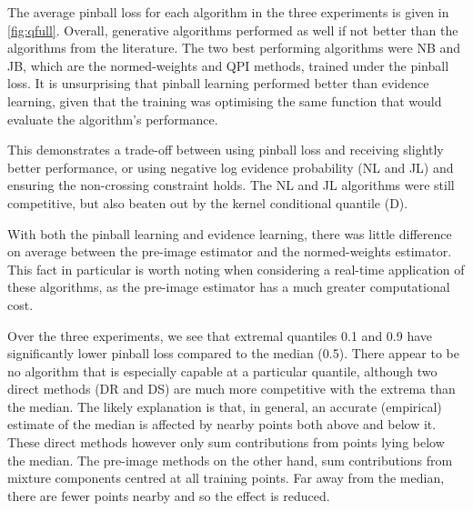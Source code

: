 \documentclass[twoside]{article} \usepackage{aistats2017}
\theoremstyle{definition}
\newcommand{\qpi}{QPI }
\begin{document}
		
		
		The average pinball loss for each algorithm in the three experiments is given in \cref{fig:qfull}. Overall, generative algorithms performed as well if not better than the algorithms from the literature. The two best performing algorithms were NB and JB, which are the normed-weights and \qpi methods, trained under the pinball loss. It is unsurprising that pinball learning performed better than evidence learning, given that the training was optimising the same function that would evaluate the algorithm's performance.

		This demonstrates a trade-off between using pinball loss and receiving slightly better performance, or using negative log evidence probability (NL and JL) and ensuring the non-crossing constraint holds. The NL and JL algorithms were still competitive, but also beaten out by the kernel conditional quantile (D).

		With both the pinball learning and evidence learning, there was little difference on average between the pre-image estimator and the normed-weights estimator. This fact in particular is worth noting when considering a real-time application of these algorithms, as the pre-image estimator has a much greater computational cost.
		
		Over the three experiments, we see that extremal quantiles 0.1 and 0.9 have significantly lower pinball loss compared to the median (0.5). There appear to be no algorithm that is especially capable at a particular quantile, although two direct methods (DR and DS) are much more competitive with the extrema than the median. The likely explanation is that, in general, an accurate (empirical) estimate of the median is affected by nearby points both above and below it. These direct methods however only sum contributions from points lying below the median. The pre-image methods on the other hand, sum contributions from mixture components centred at all training points. Far away from the median, there are fewer points nearby and so the effect is reduced.
		
\end{document}

